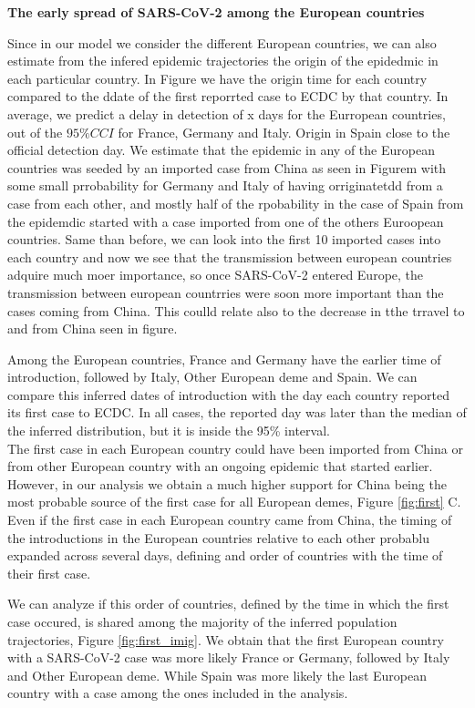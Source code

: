 \textbf{The early spread of SARS-CoV-2 among the European countries}


Since in our model we consider the different European countries, we can also estimate from the infered epidemic trajectories the origin of the epidedmic in each particular country. In Figure we have the origin time for each country compared to the ddate of the first reporrted case to ECDC by that country. In average, we predict a delay in detection of x days for the Eurropean countries, out of the $95\% CCI$ for France, Germany and Italy. Origin in Spain close to the official detection day. We estimate that the epidemic in any of the European countries was seeded by an imported case from China as seen in Figurem with some small prrobability for Germany and Italy of having orriginatetdd from a case from each other, and mostly half of the rpobability in the case of Spain from the epidemdic started with a case imported from one of the others Euroopean countries. Same than before, we can look into the first 10 imported cases into each country and now we see that the transmission between european countries adquire much moer importance,  so once SARS-CoV-2 entered Europe, the transmission between european countrries were soon more important than the cases coming from China. This coulld relate also to the decrease in tthe trravel to and from China seen in figure.

Among the European countries, France and Germany have the earlier time of introduction, followed by Italy, Other European deme and Spain. We can compare this inferred dates of introduction with the day each country reported its first case to ECDC. In all cases, the reported day was later than the median of the inferred distribution, but it is inside the 95\% interval.\\

The first case in each European country could have been imported from China or from other European country with an ongoing epidemic that started earlier. However, in our analysis we obtain a much higher support for China being the most probable source of the first case for all European demes, Figure \ref{fig:first} C.\\

Even if the first case in each European country came from China, the timing of the introductions in the European countries relative to each other probablu expanded across several days, defining and order of countries with the time of their first case. 

We can analyze if this order of countries, defined by the time in which the first case occured, is shared among the majority of the inferred population trajectories, Figure \ref{fig:first_imig}. We obtain that the first European country with a SARS-CoV-2 case was more likely France or Germany, followed by Italy and Other European deme. While Spain was more likely the last European country with a case among the ones included in the analysis.\\

